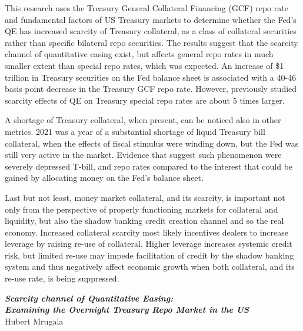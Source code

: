 \documentclass[11pt,a4paper,english,oneside]{article}
\begin{document}
This research uses the Treasury General Collateral Financing (GCF) repo rate and fundamental factors of US Treasury markets to determine whether the Fed's QE has increased scarcity of Treasury collateral, as a class of collateral securities rather than specific bilateral repo securities. The results suggest that the scarcity channel of quantitative easing exist, but affects general repo rates in much smaller extent than special repo rates, which was expected. An increase of \$1 trillion in Treasury securities on the Fed balance sheet is associated with a 40-46 basis point decrease in the Treasury GCF repo rate. However, previously studied scarcity effects of QE on Treasury special repo rates are about 5 times larger.

A shortage of Treasury collateral, when present, can be noticed also in other metrics. 2021 was a year of a substantial shortage of liquid Treasury bill collateral, when the effects of fiscal stimulus were winding down, but the Fed was still very active in the market. Evidence that suggest such phenomenon were severely depressed T-bill, and repo rates compared to the interest that could be gained by allocating money on the Fed's balance sheet.

Last but not least, money market collateral, and its scarcity, is important not only from the perspective of properly functioning markets for collateral and liquidity, but also the shadow banking credit creation channel and so the real economy. Increased collateral scarcity most likely incentives dealers to increase leverage by raising re-use of collateral. Higher leverage increases systemic credit risk, but limited re-use may impede facilitation of credit by the shadow banking system and thus negatively affect economic growth when both collateral, and its re-use rate, is being suppressed.
\newpage
\tableofcontents
\newpage
\listoffigures
\listoftables
\newpage
{}

\begin{center}
  {\Large \emph{\textbf{Scarcity channel of Quantitative Easing:\\
  Examining the Overnight Treasury Repo Market in the US}}}\\[4pt]
  Hubert Mrugala
\end{center}

\end{document}
